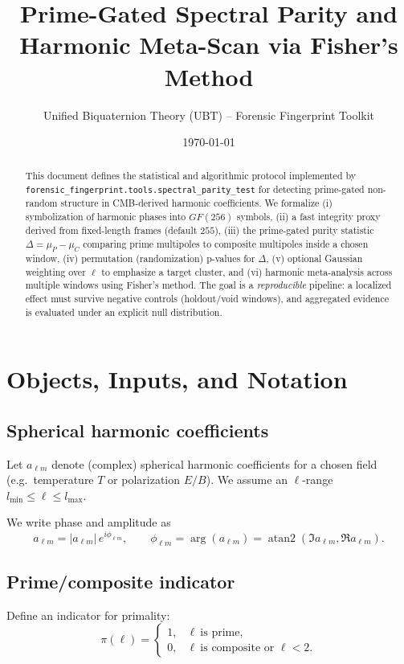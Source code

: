 \documentclass[11pt,a4paper]{article}
\title{Prime-Gated Spectral Parity and Harmonic Meta-Scan via Fisher's Method}
\author{Unified Biquaternion Theory (UBT) -- Forensic Fingerprint Toolkit}
\date{\today}
\begin{document}
\maketitle

\begin{abstract}
This document defines the statistical and algorithmic protocol implemented by
\texttt{forensic\_fingerprint.tools.spectral\_parity\_test} for detecting
prime-gated non-random structure in CMB-derived harmonic coefficients.
We formalize (i) symbolization of harmonic phases into $GF(256)$ symbols,
(ii) a fast integrity proxy derived from fixed-length frames (default $255$),
(iii) the prime-gated purity statistic $\Delta=\mu_P-\mu_C$ comparing prime
multipoles to composite multipoles inside a chosen window,
(iv) permutation (randomization) p-values for $\Delta$,
(v) optional Gaussian weighting over $\ell$ to emphasize a target cluster, and
(vi) harmonic meta-analysis across multiple windows using Fisher's method.
The goal is a \emph{reproducible} pipeline: a localized effect must survive
negative controls (holdout/void windows), and aggregated evidence is evaluated
under an explicit null distribution.
\end{abstract}

\tableofcontents

\section{Objects, Inputs, and Notation}

\subsection{Spherical harmonic coefficients}
Let $a_{\ell m}$ denote (complex) spherical harmonic coefficients for a chosen
field (e.g.\ temperature $T$ or polarization $E/B$). We assume an $\ell$-range
$l_{\min}\le \ell\le l_{\max}$.

We write phase and amplitude as
\begin{equation}
a_{\ell m} = |a_{\ell m}|\,e^{i\phi_{\ell m}},\qquad
\phi_{\ell m}=\arg(a_{\ell m})=\operatorname{atan2}(\Im a_{\ell m}, \Re a_{\ell m}).
\end{equation}

\subsection{Prime/composite indicator}
Define an indicator for primality:
\begin{equation}
\pi(\ell)=
\begin{cases}
1, & \ell\ \text{is prime},\\
0, & \ell\ \text{is composite or } \ell<2.
\end{cases}
\end{equation}
\end{document}
